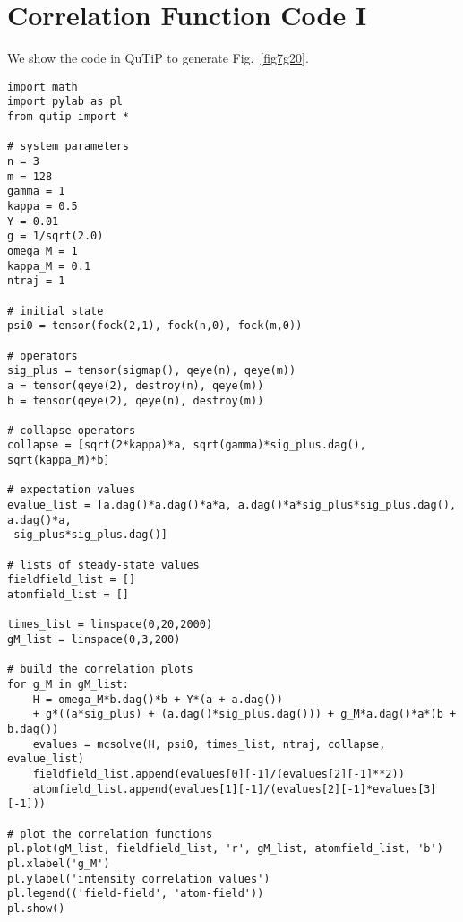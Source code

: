 \chapter{Correlation Function Code I}
We show the code in QuTiP to generate Fig.~\ref{fig7g20}.

\begin{verbatim}
import math
import pylab as pl
from qutip import *

# system parameters
n = 3
m = 128
gamma = 1
kappa = 0.5
Y = 0.01
g = 1/sqrt(2.0)
omega_M = 1
kappa_M = 0.1
ntraj = 1

# initial state
psi0 = tensor(fock(2,1), fock(n,0), fock(m,0))

# operators
sig_plus = tensor(sigmap(), qeye(n), qeye(m))
a = tensor(qeye(2), destroy(n), qeye(m))
b = tensor(qeye(2), qeye(n), destroy(m))

# collapse operators
collapse = [sqrt(2*kappa)*a, sqrt(gamma)*sig_plus.dag(), sqrt(kappa_M)*b]

# expectation values
evalue_list = [a.dag()*a.dag()*a*a, a.dag()*a*sig_plus*sig_plus.dag(), a.dag()*a,
 sig_plus*sig_plus.dag()]

# lists of steady-state values
fieldfield_list = []
atomfield_list = []

times_list = linspace(0,20,2000)
gM_list = linspace(0,3,200)

# build the correlation plots
for g_M in gM_list:
    H = omega_M*b.dag()*b + Y*(a + a.dag()) 
    + g*((a*sig_plus) + (a.dag()*sig_plus.dag())) + g_M*a.dag()*a*(b + b.dag())
    evalues = mcsolve(H, psi0, times_list, ntraj, collapse, evalue_list)
    fieldfield_list.append(evalues[0][-1]/(evalues[2][-1]**2))
    atomfield_list.append(evalues[1][-1]/(evalues[2][-1]*evalues[3][-1]))

# plot the correlation functions
pl.plot(gM_list, fieldfield_list, 'r', gM_list, atomfield_list, 'b')
pl.xlabel('g_M')
pl.ylabel('intensity correlation values')
pl.legend(('field-field', 'atom-field'))
pl.show()
\end{verbatim}